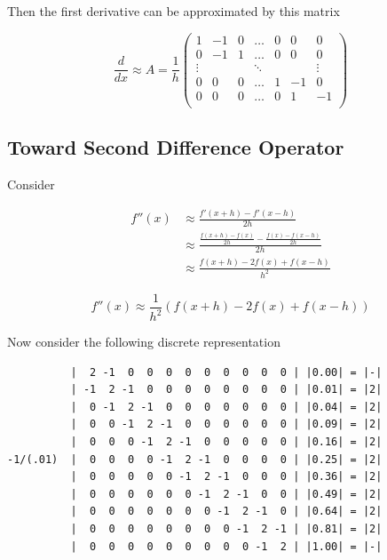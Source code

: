 \documentclass[12pt,]{book}
\begin{document}
Then the first derivative can be approximated by this matrix

\begin{equation}\frac{d}{dx} \approx A = 
\frac{1}{h}\left(\begin{matrix}
1 & -1 &  0 & \dots & 0 & 0 & 0 \\
0 & -1 & 1 & \dots &  0 & 0 & 0 \\
\vdots & \ & \ & \ddots & \ & \ & \vdots \\
0 & 0 & 0 & \dots & 1 & -1 & 0 \\
0 & 0 & 0 & \dots & 0 & 1 & -1 \\
\end{matrix}\right)
\label{eq:first_difference_operator}\end{equation}

\pagebreak

\subsection{Toward Second Difference
Operator}\label{toward-second-difference-operator}

Consider

\begin{align*}
f''(x) &\approx \frac{f'(x+h)-f'(x-h)}{2h}\\
&\approx \frac{\frac{f(x+h)-f(x)}{2h}-\frac{f(x)-f(x-h)}{2h}}{2h}\\
&\approx \frac{f(x+h) - 2f(x) + f(x-h)}{h^2}\tag{with $2h$ recast as $h$}
\end{align*}

\begin{equation}f''(x)\approx \frac{1}{h^2}\left(f(x+h) - 2f(x) + f(x-h)\right)\label{eq:second_difference}\end{equation}

Now consider the following discrete representation

\begin{verbatim}
          |  2 -1  0  0  0  0  0  0  0  0  0 | |0.00| = |-|
          | -1  2 -1  0  0  0  0  0  0  0  0 | |0.01| = |2| 
          |  0 -1  2 -1  0  0  0  0  0  0  0 | |0.04| = |2|
          |  0  0 -1  2 -1  0  0  0  0  0  0 | |0.09| = |2|
          |  0  0  0 -1  2 -1  0  0  0  0  0 | |0.16| = |2|
-1/(.01)  |  0  0  0  0 -1  2 -1  0  0  0  0 | |0.25| = |2|
          |  0  0  0  0  0 -1  2 -1  0  0  0 | |0.36| = |2|
          |  0  0  0  0  0  0 -1  2 -1  0  0 | |0.49| = |2|
          |  0  0  0  0  0  0  0 -1  2 -1  0 | |0.64| = |2|
          |  0  0  0  0  0  0  0  0 -1  2 -1 | |0.81| = |2|
          |  0  0  0  0  0  0  0  0  0 -1  2 | |1.00| = |-|
\end{verbatim}
\end{document}
